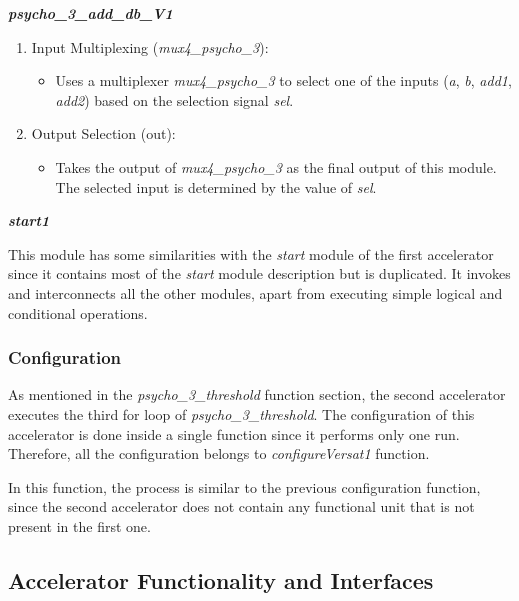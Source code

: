 \textbf{\textit{psycho\_3\_add\_db\_V1}}

\begin{enumerate}

\item Input Multiplexing (\textit{mux4\_psycho\_3}):
\begin{itemize}
\item Uses a multiplexer \textit{mux4\_psycho\_3} to select one of the inputs (\textit{a}, \textit{b}, \textit{add1}, \textit{add2}) based on the selection signal \textit{sel}.
\end{itemize}

\item Output Selection (out):
\begin{itemize}
\item Takes the output of \textit{mux4\_psycho\_3} as the final output of this module. The selected input is determined by the value of \textit{sel}.
\end{itemize}

\end{enumerate}

\vspace{0.5cm}

\textbf{\textit{start1}}

This module has some similarities with the \textit{start} module of the first accelerator since it contains most of the \textit{start} module description but is duplicated.
It invokes and interconnects all the other modules, apart from executing simple logical and conditional operations.

\subsubsection{Configuration}

As mentioned in the \textit{psycho\_3\_threshold} function section, the second accelerator executes the third for loop of \textit{psycho\_3\_threshold}.
The configuration of this accelerator is done inside a single function since it performs only one run. Therefore, all the configuration belongs to \textit{configureVersat1} function.

In this function, the process is similar to the previous configuration function, since the second accelerator does not contain any functional unit that is not present in the first one.

\subsection{Accelerator Functionality and Interfaces}

